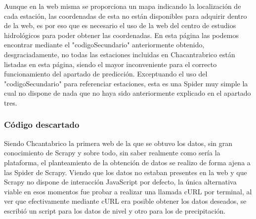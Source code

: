 Aunque en la web misma se proporciona un mapa indicando la localización de cada estación, las coordenadas de esta no están disponibles para adquirir dentro de la web, es por eso que es necesario el uso de la web del centro de estudios hidrológicos para poder obtener las coordenadas. En esta página las podemos encontrar mediante el "codigoSecundario" anteriormente obtenido, desgraciadamente, no todas las estaciones incluidas en Chacantrabrico están listadas en esta página, siendo el mayor inconveniente para el correcto funcionamiento del apartado de predicción.\newline
\newline
Exceptuando el uso del "codigoSecundario" para referenciar estaciones, esta es una Spider muy simple la cual no dispone de nada que no haya sido anteriormente explicado en el apartado tres.

\subsubsection{Código descartado}
Siendo Chcantabrico la primera web de la que se obtuvo los datos, sin gran conocimiento de Scrapy y sobre todo, sin saber realmente como sería la plataforma, el planteamiento de la obtención de datos se realizo de forma ajena a las Spider de Scrapy. Viendo que los datos no estaban presentes en la web y que Scrapy no dispone de interacción JavaScript por defecto, la única alternativa viable en esos momentos fue probar a realizar una llamada cURL por terminal, al ver que efectivamente mediante cURL era posible obtener los datos deseados, se escribió un script para los datos de nivel y otro para los de precipitación.

